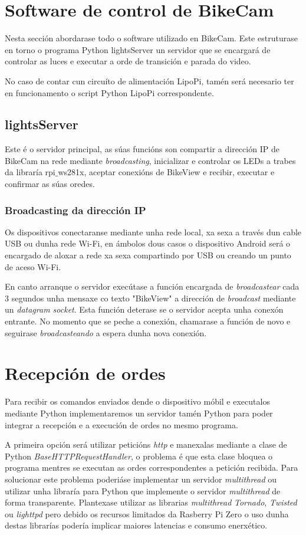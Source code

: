 \section{Software de control de BikeCam}
Nesta sección abordarase todo o software utilizado en BikeCam. Este estruturase en torno o programa Python lightsServer un servidor que se encargará de controlar as luces e executar a orde de transición e parada do video.

No caso de contar cun circuíto de alimentación LipoPi, tamén será necesario ter en funcionamento o script Python LipoPi correspondente.
\subsection{lightsServer}
Este é o servidor principal, as súas funcións son compartir a dirección IP de BikeCam na rede mediante \emph{broadcasting}, inicializar e controlar os LEDs a trabes da libraría rpi\(\_\)ws281x, aceptar conexións de BikeView e recibir, executar e confirmar as súas oredes.
\subsubsection{Broadcasting da dirección IP}
Os dispositivos conectaranse mediante unha rede local, xa sexa a través dun cable USB ou dunha rede Wi-Fi, en ámbolos dous casos o dispositivo Android será o encargado de aloxar a rede xa sexa compartindo por USB ou creando un punto de aceso Wi-Fi.

En canto arranque o servidor execútase a función encargada de \emph{broadcastear} cada 3 segundos unha mensaxe co texto "BikeView" a dirección de \emph{broadcast} mediante un \emph{datagram socket}. Esta función deterase se o servidor acepta unha conexón entrante. No momento que se peche a conexión, chamarase a función de novo e seguirase \emph{broadcasteando} a espera dunha nova conexión.

\section{Recepción de ordes}
 Para recibir os comandos enviados dende o dispositivo móbil e executalos mediante Python implementaremos un servidor tamén Python para poder integrar a recepción e a execución de ordes no mesmo programa.

 A primeira opción será utilizar peticións \emph{http} e manexalas mediante a clase de Python \emph{BaseHTTPRequestHandler}, o problema é que esta clase bloquea o programa mentres se executan as ordes correspondentes a petición recibida. Para solucionar este problema poderiáse implementar un servidor \emph{multithread} ou utilizar unha libraría para Python que implemente o servidor \emph{multithread} de forma transparente. Plantexase utilizar as librarias \emph{multithread} \emph{Tornado}, \emph{Twisted} ou \emph{lighttpd} pero debido os recursos limitados da Rasberry Pi Zero o uso dunha destas librarías podería implicar maiores latencias e consumo enerxético.

